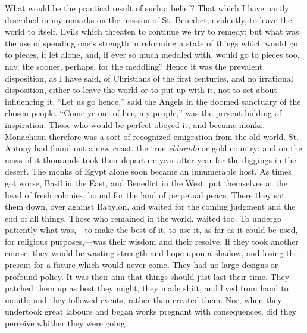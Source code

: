 What would be the practical result of such a belief? That
which I have partly described in my remarks on the mission of St.
Benedict; evidently, to leave the world to itself. Evils which
threaten to continue we try to remedy; but what was the use of
spending one's strength in reforming a state of things which would go
to pieces, if let alone, and, if ever so much meddled with, would go
to pieces too, nay, the sooner, perhaps, for the meddling? Hence it
was the prevalent disposition, as I have said, of Christians of the
first centuries, and no irrational disposition, either to leave the
world or to put up with it, not to set about influencing it. ``Let
us go hence,'' said the Angels in the doomed sanctuary of the
chosen people. ``Come ye out of her, my people,'' was the
present bidding of inspiration. Those who would be perfect obeyed it,
and became monks. Monachism therefore was a sort of recognized
emigration from the old world. St. Antony had found out a new coast,
the true \emph{eldorado} or gold country; and on the news of it
thousands took their departure year after year for the diggings in the
desert. The monks of Egypt alone soon became an innumerable host. As
times got worse, Basil in the East, and Benedict in the West, put
themselves at the head of fresh colonies, bound for the land of
perpetual peace. There they sat them down, over against Babylon, and
waited for the coming judgment and the end of all things. Those who
remained in the world, waited too. To undergo patiently what was,—to
make the best of it, to use it, as far as it could be used, for
religious purposes,—was their wisdom and their resolve. If they took
another course, they would be wasting strength and hope upon a shadow,
and losing the present for a future which would never come. They had
no large designs or profound policy. It was their aim that things
should just last their time. They patched them up as best they
might, they made shift, and lived from hand to mouth; and they
followed events, rather than created them. Nor, when they undertook
great labours and began works pregnant with consequences, did they
perceive whither they were going.

